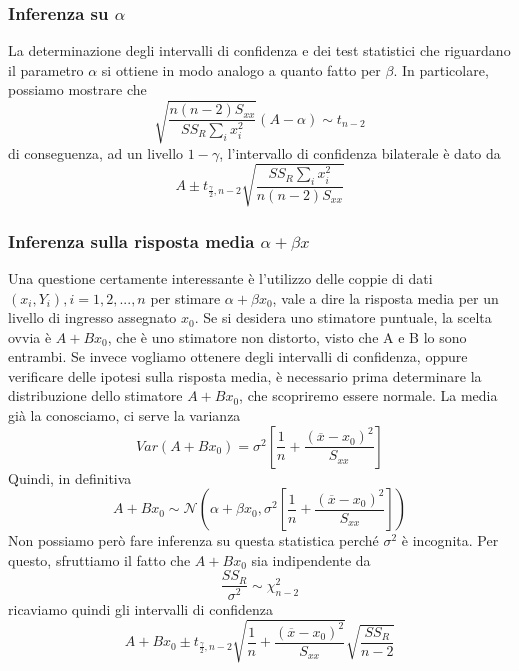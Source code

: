 \documentclass[11pt]{article}
\begin{document}
\subsubsection{Inferenza su $\alpha$}
La determinazione degli intervalli di confidenza e dei test statistici che riguardano il parametro $\alpha$ si ottiene in modo analogo a quanto fatto per $\beta$. In particolare, possiamo mostrare che 
\begin{displaymath}
    \sqrt{\frac{n(n-2)S_{xx}}{SS_R\sum_i x_i^2}}(A-\alpha)\sim t_{n-2}
\end{displaymath}
di conseguenza, ad un livello $1-\gamma$, l'intervallo di confidenza bilaterale è dato da 
\begin{displaymath}
    A\pm t_{\frac{\gamma}{2},n-2}\sqrt{\frac{SS_R\sum_i x_i^2}{n(n-2)S_{xx}}}
\end{displaymath}
\subsubsection{Inferenza sulla risposta media $\alpha+\beta x$}
Una questione certamente interessante è l'utilizzo delle coppie di dati $(x_i, Y_i),i=1,2,...,n$ per stimare $\alpha+\beta x_0$, vale a dire la risposta media per un livello di ingresso assegnato $x_0$. Se si desidera uno stimatore puntuale, la scelta ovvia è $A+Bx_0$, che è uno stimatore non distorto, visto che A e B lo sono entrambi. Se invece vogliamo ottenere degli intervalli di confidenza, oppure verificare delle ipotesi sulla risposta media, è necessario prima determinare la distribuzione dello stimatore $A+Bx_0$, che scopriremo essere normale. La media già la conosciamo, ci serve la varianza
\begin{displaymath}
    Var(A+Bx_0)=\sigma^2\left[\frac{1}{n}+\frac{(\overline{x}-x_0)^2}{S_{xx}}\right]
\end{displaymath}
Quindi, in definitiva
\begin{displaymath}
    A+Bx_0 \sim \mathcal{N}\left(\alpha+\beta x_0, \sigma^2\left[\frac{1}{n}+\frac{(\overline{x}-x_0)^2}{S_{xx}}\right]\right)
\end{displaymath}
Non possiamo però fare inferenza su questa statistica perché $\sigma^2$ è incognita. Per questo, sfruttiamo il fatto che $A+Bx_0$ sia indipendente da
\begin{displaymath}
    \frac{SS_R}{\sigma^2}\sim \chi^2_{n-2}
\end{displaymath}
ricaviamo quindi gli intervalli di confidenza
\begin{displaymath}
    A+Bx_0 \pm t_{\frac{\gamma}{2},n-2}\sqrt{\frac{1}{n}+\frac{(\overline{x}-x_0)^2}{S_{xx}}}\sqrt{\frac{SS_R}{n-2}}
\end{displaymath}
\end{document}
